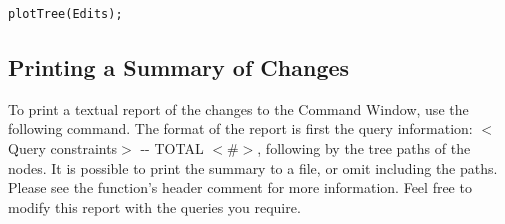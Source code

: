 \documentclass{article}
\begin{document}
\begin{lstlisting}
plotTree(Edits);
\end{lstlisting}

\subsection{Printing a Summary of Changes}
To print a textual report of the changes to the Command Window, use the following command. The format of the report is first the query information: $<$Query constraints$>$ -{}- TOTAL $<$\#$>$, following by the tree paths of the nodes. It is possible to print the summary to a  file, or omit including the paths. Please see the function's header comment for more information. Feel free to modify this report with the queries you require.
\end{document}
